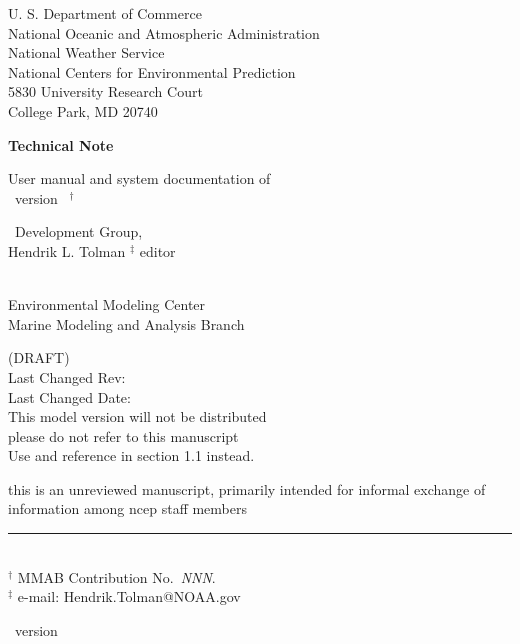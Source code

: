 
\pagestyle{empty}

\begin{center} 
U. S. Department of Commerce \\
National Oceanic and Atmospheric Administration \\
National Weather Service \\
National Centers for Environmental Prediction \\
5830 University Research Court \\
College Park, MD 20740


\vspace{15mm}

{\bf Technical Note}

\vspace{15mm}

{\large User manual and system documentation of \\
\ww\ version \WWver\ $^\dag$} \\

\vspace{15mm}

\ww\ Development Group, \\
Hendrik L. Tolman $^\ddag$ editor\\
\strut \\
Environmental Modeling Center \\
Marine Modeling and Analysis Branch

\vfill

(DRAFT) \\
Last Changed Rev: \SVNRevision \\
Last Changed Date: \SVNDate \\
\vspace{\baselineskip}
This model version will not be distributed \\
{\sc please do not refer to this manuscript} \\
Use \cite{tol:MMAB09a} and reference in section 1.1 instead.


\vfill
{\sc this is an unreviewed manuscript, primarily intended for informal
exchange of information among ncep staff members}

\end{center}
\noindent \rule{140mm}{0.5mm} \\
{\small $^\dag$ MMAB Contribution No.~{\it NNN}. \\
$^\ddag$ e-mail: Hendrik.Tolman@NOAA.gov}

\bpage

\pb

         { \hspace{20.5mm} \ws\ version \WWver}
\pagestyle{myheadings}
\setcounter{page}{1}
\tableofcontents



\pb
\pagestyle{myheadings}

